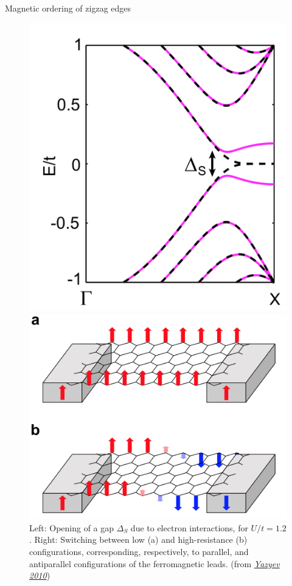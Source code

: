 \documentclass{beamer}
\begin{document}
\begin{frame}{Magnetic ordering of zigzag edges}
	\begin{figure}[ht!]
	\hspace{-3cm}
\begin{minipage}[c]{0.1\textwidth}
\centering
\includegraphics[scale = 0.177]{AF_GS}
\end{minipage} \hspace{4cm}
\begin{minipage}[c]{0.1\textwidth}
\includegraphics[scale = 0.157]{magnetoresistance}
\end{minipage}
 \caption{Left: Opening of a gap $\Delta_S$ due to electron interactions, for $U/t = 1.2$. Right: Switching between low (a) and high-resistance (b) configurations, corresponding, respectively, to parallel, and antiparallel configurations of the ferromagnetic leads. (from 
    \href{https://arxiv.org/pdf/1004.2034.pdf}{\emph{Yazyev 2010}})}
\end{figure}


\end{frame}
\end{document}
